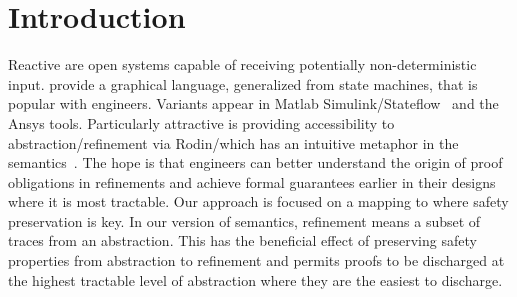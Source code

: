 

\section{Introduction}
\label{sec:intro}




Reactive \SCs are open systems capable of receiving potentially non-deterministic input. 
\SCs provide a graphical language, generalized from state machines, that is popular with engineers.
Variants appear in Matlab Simulink/Stateflow~\cite{MATLAB:2019} and the Ansys tools.  
Particularly attractive is providing accessibility to abstraction/refinement via Rodin/\EventB which has an intuitive metaphor in the \SC semantics~\cite{MoSnHo18,MoSnHo-ABZ2020,detect2020}.  
The hope is that engineers can better understand the origin of proof obligations in refinements and achieve formal guarantees earlier in their designs where it is most tractable.
Our approach is focused on a mapping to \EventB where safety preservation is key.  
In our version of \SC semantics, refinement means a subset of traces from an abstraction. 
This has the beneficial effect of preserving safety properties from abstraction to refinement and permits proofs to be discharged at the highest tractable level of abstraction where they are the easiest to discharge.

